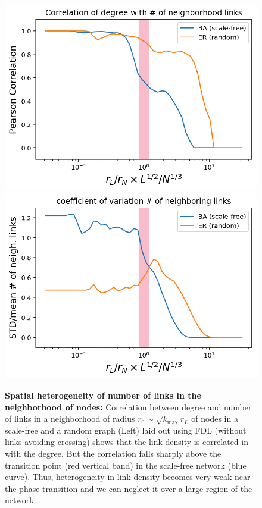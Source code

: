 \documentclass[11pt]{article}
\begin{document}
\begin{response}
\begin{figure}[ht]
    \centering
    \includegraphics[width=.45\textwidth]{fig-09-19/corr-deg-neigh.png}\includegraphics[width=.45\textwidth]{fig-09-19/coeff-var-neigh.png}
    \caption{{\bf Spatial heterogeneity of number of links in the neighborhood of nodes: }
    Correlation between degree and number of links in a neighborhood of radius $r_0\sim \sqrt{k_{\max}} r_L  $ of nodes in a scale-free and a random graph (Left) laid out using FDL (without links avoiding crossing) shows that the link density is correlated in with the degree. 
    But the correlation falls sharply above the transition point (red vertical band) in the scale-free network (blue curve).
    Thus, heterogeneity in link density becomes very weak near the phase transition and we can neglect it over a large region of the network.
    }
    \label{fig:neigh}
\end{figure}


\end{response}
\end{document}

